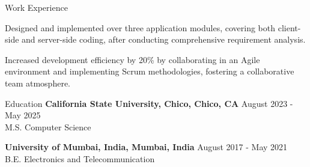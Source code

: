 \documentclass{resume} %
\begin{document}
\begin{rSection}{Work Experience}
\begin{rSubsection}
                                    \item Designed and implemented over three application modules, covering both client{-}side and server{-}side coding, after conducting comprehensive requirement analysis.
                                    \item Increased development efficiency by 20\% by collaborating in an Agile environment and implementing Scrum methodologies, fostering a collaborative team atmosphere.
                            \end{rSubsection}
            \end{rSection}

\begin{rSection}{Education}
                        \textbf{California State University, Chico, Chico, CA} \hfill {August 2023 - May 2025} \\
                            {M.S. Computer Science}
                         
             
         
                        \textbf{University of Mumbai, India, Mumbai, India} \hfill {August 2017 - May 2021} \\
                            {B.E. Electronics and Telecommunication}
                         
             
         
    \end{rSection}
\end{document}
